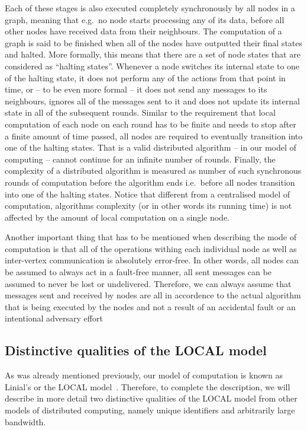 Each of these stages is also executed
completely synchronously by all nodes in a graph, meaning that e.g.\ no node starts processing
any of its data, before all other nodes have received data from their neighbours. The computation
of a graph is said to be finished when all of the nodes have outputted their final states
and halted. More formally, this means that there are a set of node states that are
considered as ``halting states''. Whenever a node switches its internal state to one of the 
halting state, it does not perform any of the actions from that point in time, or -- to
be even more formal -- it does not send any messages to its neighbours, ignores all of the 
messages sent to it and does not update its internal state in all of the subsequent rounds.
Similar to the requirement that local computation of each node on each round has to be finite
and needs to stop after a finite amount of time passed, all nodes are required to eventually
transition into one of the halting states. That is a valid distributed algorithm -- in our model of
computing -- cannot continue for an infinite number of rounds. Finally,
the complexity of a distributed algorithm is measured as number of such synchronous rounds
of computation before the algorithm ends i.e.\ before all nodes transition into one of 
the halting states. Notice that different from a centralised model of computation,
algorithms complexity (or in other words its running time) is not affected by the
amount of local computation on a single node.

Another important thing that has to be mentioned when describing the mode of computation
is that all of the operations withing each individual node as well as inter-vertex
communication is absolutely error-free. In other words, all nodes can be assumed to
always act in a fault-free manner, all sent messages can be assumed to never be lost
or undelivered. Therefore, we can always assume that messages sent and received by nodes
are all in accordence to the actual algorithm that is being executed by the nodes 
and not a result of an accidental fault or an intentional adversary effort

\subsection{Distinctive qualities of the LOCAL model}

As was already mentioned previously, our model of computation is known
as Linial's or the LOCAL model~\cite{Linial1987}. Therefore, to complete the
description, we will describe in more detail two distinctive qualities of the LOCAL model
from other models of distributed computing, namely unique identifiers and arbitrarily large
bandwidth.

